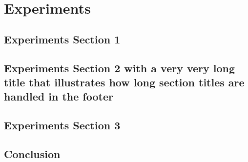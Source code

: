 %
\chapter{Experiments}
\label{sec:experiments}


\Blindtext[2][1]

\section{Experiments Section 1}
\label{sec:experiments:sec1}

\Blindtext[2][2]

\section{Experiments Section 2 with a very very long title that illustrates how long section titles are handled in the footer}
\label{sec:experiments:sec2}

\Blindtext[3][2]

\section{Experiments Section 3}
\label{sec:experiments:sec3}

\Blindtext[4][2]

\section{Conclusion}
\label{sec:experiments:conclusion}

\Blindtext[2][1]